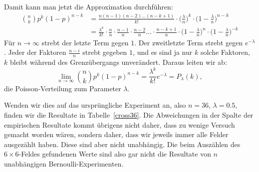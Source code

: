 Damit kann man jetzt die Approximation durchführen:
\begin{align*}
\binom{n}{k}p^k(1-p)^{n-k}
&=
\frac{n(n-1)(n-2)\dots(n-k+1)}{k!}\cdot \biggl(\frac{\lambda}n\biggr)^k\cdot \biggl(1-\frac{\lambda}n\biggr)^{n-k}\\
&=
\frac{\lambda^k}{k!}
\cdot\frac{n}{n}
\cdot\frac{n-1}{n}
\cdot\frac{n-2}{n}
\dots
\cdot\frac{n-k+1}{n}
\cdot
\biggl(1-\frac{\lambda}n\biggr)^n
\cdot
\biggl(1-\frac{\lambda}n\biggr)^{-k}
\end{align*}
Für $n\to\infty$ strebt der letzte Term gegen $1$.
Der zweitletzte Term strebt gegen $e^{-\lambda}$.
Jeder der Faktoren $\frac{n-i}n$ strebt gegeben $1$, und es sind ja nur
$k$ solche Faktoren, $k$ bleibt während des Grenzübergangs unverändert.
Daraus leiten wir ab:
\[
\lim_{n\to\infty} 
\binom{n}{k}p^k(1-p)^{n-k}
=
\frac{\lambda^k}{k!}e^{-\lambda}=P_{\lambda}(k),
\]
die Poisson-Verteilung zum Parameter $\lambda$.

Wenden wir dies auf das ursprüngliche Experiment an, also $n=36$,
$\lambda=0.5$, finden wir die Resultate in Tabelle~\ref{cross36}. 
Die Abweichungen in der Spalte der empirischen Resultate kommt übrigens
nicht daher, dass zu wenige Versuch gemacht worden wären, sondern daher,
dass wir jeweils immer alle Felder ausgezählt haben.
Diese sind aber nicht
unabhängig.
Die beim Auszählen des $6\times 6$-Feldes gefundenen Werte
sind also gar nicht die Resultate von $n$ unabhängigen Bernoulli-Experimenten.
